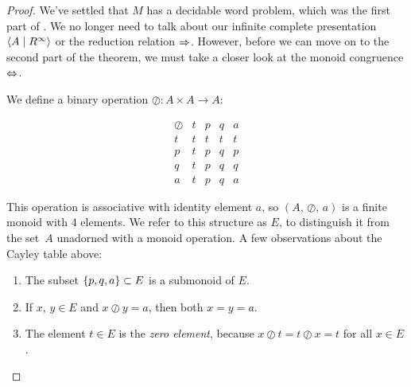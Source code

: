 \documentclass[../generics]{subfiles}
\begin{document}
\begin{proof}
We've settled that $M$ has a decidable word problem, which was the first part of . We no longer need to talk about our infinite complete presentation $\langle A \mid R^\infty\rangle$ or the reduction relation $\Rightarrow$. However, before we can move on to the second part of the theorem, we must take a closer look at the monoid congruence $\Leftrightarrow$.

\begin{definition}\label{def:tpqa oslash}
We define a binary operation $\oslash\colon A \times A \rightarrow A$:
\begin{ceqn}
\[
\begin{array}{c|cccc}
\oslash&t&p&q&a \\
\hline
t&t&t&t&t\\
p&t&p&q&p \\
q&t&p&q&q \\
a&t&p&q&a
\end{array}
\]
\end{ceqn}
This operation is associative with identity element $a$, so $(A,\, \oslash,\, a)$ is a finite monoid with 4 elements. We refer to this structure as $E$, to distinguish it from the set~$A$ unadorned with a monoid operation. A few observations about the Cayley table above:
\begin{enumerate}
\item The subset $\{p,q,a\} \subset E$ is a submonoid of $E$.
\item If $x$, $y \in E$ and $x \oslash y = a$, then both $x=y=a$.
\item The element $t \in E$ is the \emph{zero element}, because $x \oslash t = t \oslash x = t$ for all $x \in E$.
\end{enumerate}
\end{definition}


\end{proof}
\end{document}
